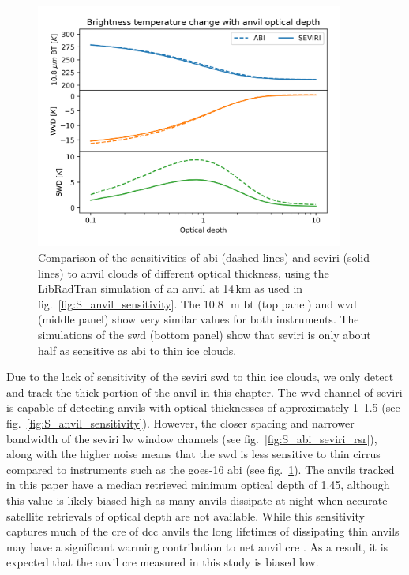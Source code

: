 \begin{figure}[tp]
    \centering
    \includegraphics[width=0.9\textwidth]{figures/chapter4_06.png}
    \caption[
    Comparison of the sensitivities of \acrshort{abi} (dashed lines) and \acrshort{seviri} (solid lines) to anvil clouds of different optical thickness
    ]{
    Comparison of the sensitivities of \acrshort{abi} (dashed lines) and \acrshort{seviri} (solid lines) to anvil clouds of different optical thickness, using the LibRadTran simulation of an anvil at 14\,\unit{km} as used in fig.~\ref{fig:S_anvil_sensitivity}. The 10.8\,\unit{\mu m} \acrshort{bt} (top panel) and \acrshort{wvd} (middle panel) show very similar values for both instruments. The simulations of the \acrshort{swd} (bottom panel) show that \acrshort{seviri} is only about half as sensitive as \acrshort{abi} to thin ice clouds.
    }
    \label{fig:S_abi_seviri_anvil_sensitivity}
\end{figure}


Due to the lack of sensitivity of the \acrshort{seviri} \acrshort{swd} to thin ice clouds, we only detect and track the thick portion of the anvil in this chapter.
The \acrshort{wvd} channel of \acrshort{seviri} is capable of detecting anvils with optical thicknesses of approximately 1--1.5 (see fig.~\ref{fig:S_anvil_sensitivity}).
However, the closer spacing and narrower bandwidth of the \acrshort{seviri} \acrshort{lw} window channels (see fig.~\ref{fig:S_abi_seviri_rsr}), along with the higher noise means that the \acrshort{swd} is less sensitive to thin cirrus compared to instruments such as the \acrshort{goes}-16 \acrshort{abi} (see fig.~\ref{fig:S_abi_seviri_anvil_sensitivity}).
The anvils tracked in this paper have a median retrieved minimum optical depth of 1.45, although this value is likely biased high as many anvils dissipate at night when accurate satellite retrievals of optical depth are not available.
While this sensitivity captures much of the \acrshort{cre} of \acrshort{dcc} anvils \citep{berry_cloud_2014} the long lifetimes of dissipating thin anvils may have a significant warming contribution to net anvil \acrshort{cre} \citep{horner_evolution_2023}.
As a result, it is expected that the anvil \acrshort{cre} measured in this study is biased low.

